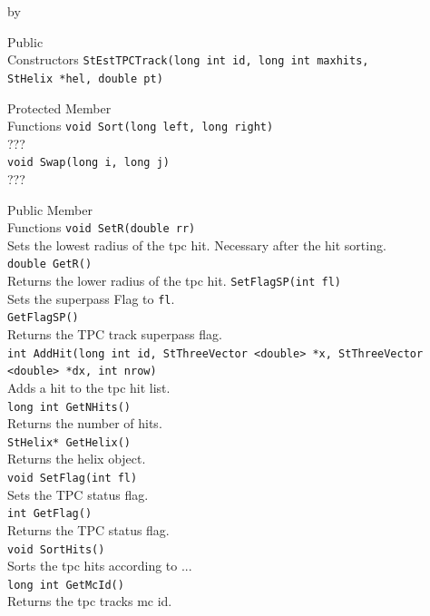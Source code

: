 \documentclass[twoside]{article}
\newcommand{\entrylabel}[1]{\mbox{\textbf{{#1}}}\hfil}%
\newenvironment{entry}
{\begin{list}{}%
    {\renewcommand{\makelabel}{\entrylabel}%
     \setlength{\labelwidth}{90pt}%
     \setlength{\leftmargin}{\labelwidth}
     \advance\leftmargin by \labelsep%
      }%
    }%
  {\end{list}}
\newcommand{\Entrylabel}[1]%
{\raisebox{0pt}[1ex][0pt]{\makebox[\labelwidth][l]%
    {\parbox[t]{\labelwidth}{\hspace{0pt}\textbf{{#1}}}}}}
\newenvironment{Entry}%
{\renewcommand{\entrylabel}{\Entrylabel}\begin{entry}}%
  {\end{entry}}
\begin{document}
\begin{Entry}
\item[Public\\ Constructors]
	\verb+StEstTPCTrack(long int id, long int maxhits,+\\
	\verb+StHelix *hel, double pt)+\\
\item[Protected Member\\ Functions]
	\verb+void Sort(long left, long right)+\\
	???\\
	\verb+void Swap(long i, long j)+\\
	???\\	
\item[Public Member\\ Functions]
	\verb+void SetR(double rr)+\\
	Sets the lowest radius of the tpc hit. Necessary after the hit sorting.\\
	\verb+double GetR()+\\
	Returns the lower radius of the tpc hit.
	\verb+SetFlagSP(int fl)+\\
	Sets the superpass Flag to \verb+fl+.\\
	\verb+GetFlagSP()+\\
	Returns the TPC track superpass flag.\\
	\verb+int AddHit(long int id, StThreeVector <double> *x, StThreeVector <double> *dx, int nrow)+\\
	Adds a hit to the tpc hit list.\\
	\verb+long int GetNHits()+\\
	Returns the number of hits.\\
	\verb+StHelix* GetHelix()+\\
	Returns the helix object.\\
	\verb+void SetFlag(int fl)+\\
	Sets the TPC status flag.\\
	\verb+int GetFlag()+\\
	Returns the TPC status flag.\\
	\verb+void SortHits()+\\
	Sorts the tpc hits according to ...\\
	\verb+long int GetMcId()+\\
	Returns the tpc tracks mc id.\\
\end{Entry}
%
%
\end{document}

